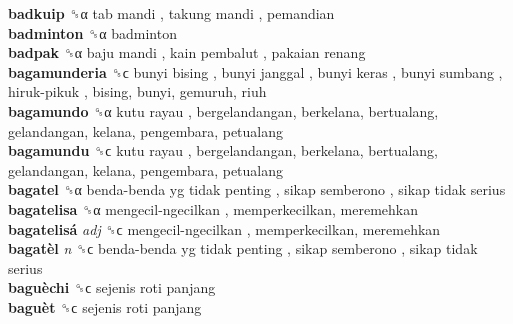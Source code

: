 \textbf{badkuip} ␝α   tab mandi ,  takung mandi , pemandian  \\
\textbf{badminton} ␝α  badminton  \\
\textbf{badpak} ␝α   baju mandi ,  kain pembalut ,  pakaian renang   \\
\textbf{bagamunderia} ␝ϲ   bunyi bising ,  bunyi janggal ,  bunyi keras ,  bunyi sumbang ,  hiruk-pikuk , bising, bunyi, gemuruh, riuh  \\
\textbf{bagamundo} ␝α   kutu rayau , bergelandangan, berkelana, bertualang, gelandangan, kelana, pengembara, petualang  \\
\textbf{bagamundu} ␝ϲ   kutu rayau , bergelandangan, berkelana, bertualang, gelandangan, kelana, pengembara, petualang  \\
\textbf{bagatel} ␝α   benda-benda yg tidak penting ,  sikap semberono ,  sikap tidak serius   \\
\textbf{bagatelisa} ␝α   mengecil-ngecilkan , memperkecilkan, meremehkan  \\
\textbf{bagatelisá} \emph{adj}  ␝ϲ   mengecil-ngecilkan , memperkecilkan, meremehkan  \\
\textbf{bagatèl} \emph{n}  ␝ϲ   benda-benda yg tidak penting ,  sikap semberono ,  sikap tidak serius   \\
\textbf{baguèchi} ␝ϲ   sejenis roti panjang   \\
\textbf{baguèt} ␝ϲ   sejenis roti panjang   \\

